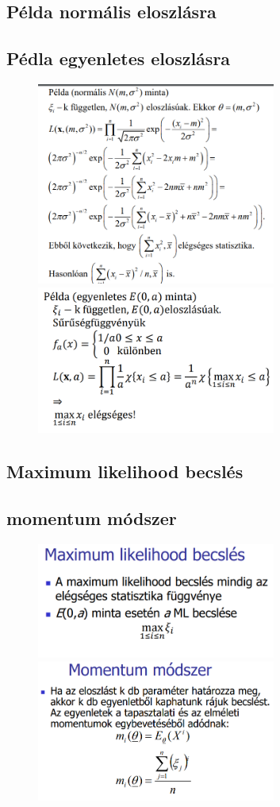 \documentclass[12pt]{article}
\begin{document}
    \newpage
    \subsection{Példa normális eloszlásra}
    \subsection{Pédla egyenletes eloszlásra}
    \begin{figure}[h]
        \centering
        \includegraphics[width=0.7\textwidth]{11.png}
        \includegraphics[width=0.7\textwidth]{12.png}
    \end{figure}

    \newpage
    \subsection{Maximum likelihood becslés}
    \subsection{momentum módszer}
    \begin{figure}[h]
        \centering
        \includegraphics[width=0.7\textwidth]{13.png}
        \includegraphics[width=0.7\textwidth]{14.png}
    \end{figure}
\end{document}
